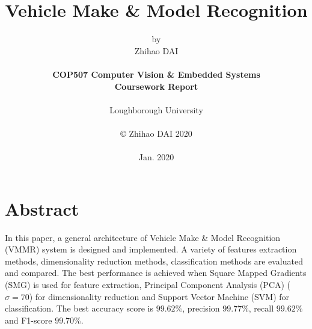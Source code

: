 \title{\bf Vehicle Make \& Model Recognition}

\author{by\\Zhihao DAI\\
\\
{\bf COP507 Computer Vision \& Embedded Systems}\\
{\bf Coursework Report}\\
\\
Loughborough University\\
\\
\copyright
\hspace{1 dd} Zhihao DAI 2020\\
\\
Jan. 2020
}
\date{} %

\maketitle


% 
% 

\chapter*{Abstract}
In this paper, a general architecture of Vehicle Make \& Model Recognition (VMMR) system is designed and implemented.
A variety of features extraction methods, dimensionality reduction methods, classification methods are evaluated and compared.
The best performance is achieved when Square Mapped Gradients (SMG) is used for feature extraction, Principal Component Analysis (PCA) ($\sigma = 70$) for dimensionality reduction and Support Vector Machine (SVM) for classification.
The best accuracy score is $99.62\%$, precision $99.77\%$, recall $99.62\%$ and F1-score $99.70\%$.


